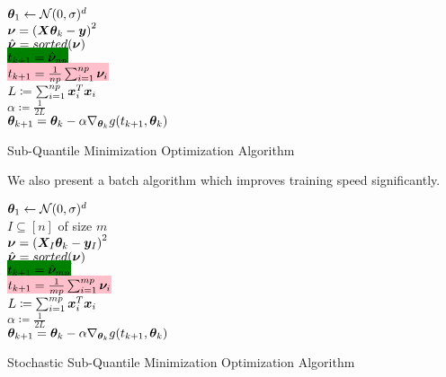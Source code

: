 \documentclass{article} %
\begin{document}
	\begin{algorithm}[H]
		\DontPrintSemicolon
		
		${\bm{\theta}}_1 \gets \mathcal{N}(0,\sigma)^d$\\
		{
			$\displaystyle {\bm{\nu}} = \left({\bm{X}}{\bm{\theta}}_k - {\bm{y}}\right)^2$\\
			$\hat{{\bm{\nu}}} = sorted({\bm{\nu}})$\\
			\colorbox{green}{$\displaystyle t_{k+1} = \hat{{\bm{\nu}}}_{np}$}\\
			\colorbox{pink}{$t_{k+1} = \frac{1}{np}\sum_{i=1}^{np}{\bm{\nu}}_i$}\\
			$L \coloneqq \sum_{i=1}^{np} {\bm{x}}_i^T{\bm{x}}_i$\\
			$\alpha \coloneqq \frac{1}{2L}$\\
			$\displaystyle {\bm{\theta}}_{k+1} = {\bm{\theta}}_k - \alpha \nabla_{{\bm{\theta}}_k}g(t_{k+1},{\bm{\theta}}_k)$
		}
		\caption{Sub-Quantile Minimization Optimization Algorithm}
		\label{alg:sqo1}
	\end{algorithm}

	We also present a batch algorithm which improves training speed significantly.

	\begin{algorithm}[H]
		\DontPrintSemicolon
		
		${\bm{\theta}}_1 \gets \mathcal{N}(0,\sigma)^d$\\
		{
			$I \subseteq \left[n\right]$ of size $m$\\
			$\displaystyle {\bm{\nu}} = \left({\bm{X}}_I{\bm{\theta}}_k - {\bm{y}}_I\right)^2$\\
			$\hat{{\bm{\nu}}} = sorted({\bm{\nu}})$\\
			\colorbox{green}{$\displaystyle t_{k+1} = \hat{{\bm{\nu}}}_{mp}$}\\
			\colorbox{pink}{$t_{k+1} = \frac{1}{mp}\sum_{i=1}^{mp}{\bm{\nu}}_i$}\\
			$L \coloneqq \sum_{i=1}^{mp} {\bm{x}}_i^T{\bm{x}}_i$\\
			$\alpha \coloneqq \frac{1}{2L}$\\
			$\displaystyle {\bm{\theta}}_{k+1} = {\bm{\theta}}_k - \alpha \nabla_{{\bm{\theta}}_k}g(t_{k+1},{\bm{\theta}}_k)$
		}
		\caption{Stochastic Sub-Quantile Minimization Optimization Algorithm}
		\label{alg:sqo-stochastic}
	\end{algorithm}
\end{document}
